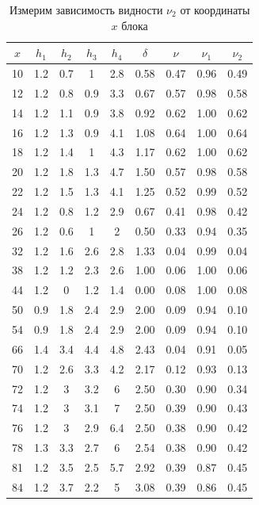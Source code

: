 \documentclass{letask}
\begin{document}
\begin{table}[H]
\centering
\caption{Измерим зависимость видности $\nu_2$ от координаты $x$ блока}
\begin{tabular}{|c|c|c|c|c|c|c|c|c|}
\hline
$x$ & $h_1$ & $h_2$ & $h_3$ & $h_4$ & $\delta$ & $\nu$ & $\nu_1$ & $\nu_2$ \\ \hline
10  & 1.2   & 0.7   & 1     & 2.8   & 0.58     & 0.47  & 0.96    & 0.49    \\ \hline
12  & 1.2   & 0.8   & 0.9   & 3.3   & 0.67     & 0.57  & 0.98    & 0.58    \\ \hline
14  & 1.2   & 1.1   & 0.9   & 3.8   & 0.92     & 0.62  & 1.00    & 0.62    \\ \hline
16  & 1.2   & 1.3   & 0.9   & 4.1   & 1.08     & 0.64  & 1.00    & 0.64    \\ \hline
18  & 1.2   & 1.4   & 1     & 4.3   & 1.17     & 0.62  & 1.00    & 0.62    \\ \hline
20  & 1.2   & 1.8   & 1.3   & 4.7   & 1.50     & 0.57  & 0.98    & 0.58    \\ \hline
22  & 1.2   & 1.5   & 1.3   & 4.1   & 1.25     & 0.52  & 0.99    & 0.52    \\ \hline
24  & 1.2   & 0.8   & 1.2   & 2.9   & 0.67     & 0.41  & 0.98    & 0.42    \\ \hline
26  & 1.2   & 0.6   & 1     & 2     & 0.50     & 0.33  & 0.94    & 0.35    \\ \hline
32  & 1.2   & 1.6   & 2.6   & 2.8   & 1.33     & 0.04  & 0.99    & 0.04    \\ \hline
38  & 1.2   & 1.2   & 2.3   & 2.6   & 1.00     & 0.06  & 1.00    & 0.06    \\ \hline
44  & 1.2   & 0     & 1.2   & 1.4   & 0.00     & 0.08  & 1.00    & 0.08    \\ \hline
50  & 0.9   & 1.8   & 2.4   & 2.9   & 2.00     & 0.09  & 0.94    & 0.10    \\ \hline
54  & 0.9   & 1.8   & 2.4   & 2.9   & 2.00     & 0.09  & 0.94    & 0.10    \\ \hline
66  & 1.4   & 3.4   & 4.4   & 4.8   & 2.43     & 0.04  & 0.91    & 0.05    \\ \hline
70  & 1.2   & 2.6   & 3.3   & 4.2   & 2.17     & 0.12  & 0.93    & 0.13    \\ \hline
72  & 1.2   & 3     & 3.2   & 6     & 2.50     & 0.30  & 0.90    & 0.34    \\ \hline
74  & 1.2   & 3     & 3.1   & 7     & 2.50     & 0.39  & 0.90    & 0.43    \\ \hline
76  & 1.2   & 3     & 2.9   & 6.4   & 2.50     & 0.38  & 0.90    & 0.42    \\ \hline
78  & 1.3   & 3.3   & 2.7   & 6     & 2.54     & 0.38  & 0.90    & 0.42    \\ \hline
81  & 1.2   & 3.5   & 2.5   & 5.7   & 2.92     & 0.39  & 0.87    & 0.45    \\ \hline
84  & 1.2   & 3.7   & 2.2   & 5     & 3.08     & 0.39  & 0.86    & 0.45    \\ \hline
\end{tabular}
\end{table}
\end{document}
